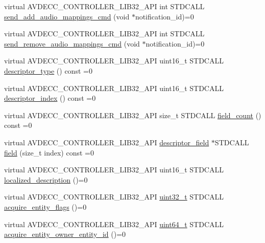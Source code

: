\begin{DoxyCompactItemize}
\item 
virtual A\+V\+D\+E\+C\+C\+\_\+\+C\+O\+N\+T\+R\+O\+L\+L\+E\+R\+\_\+\+L\+I\+B32\+\_\+\+A\+PI int S\+T\+D\+C\+A\+LL \hyperlink{classavdecc__lib_1_1stream__port__output__descriptor_a5d94b5190eaba5a650afd90d6e483d72}{send\+\_\+add\+\_\+audio\+\_\+mappings\+\_\+cmd} (void $\ast$notification\+\_\+id)=0
\item 
virtual A\+V\+D\+E\+C\+C\+\_\+\+C\+O\+N\+T\+R\+O\+L\+L\+E\+R\+\_\+\+L\+I\+B32\+\_\+\+A\+PI int S\+T\+D\+C\+A\+LL \hyperlink{classavdecc__lib_1_1stream__port__output__descriptor_ae22529f0333bc3efc10d16ecb3700cd5}{send\+\_\+remove\+\_\+audio\+\_\+mappings\+\_\+cmd} (void $\ast$notification\+\_\+id)=0
\item 
virtual A\+V\+D\+E\+C\+C\+\_\+\+C\+O\+N\+T\+R\+O\+L\+L\+E\+R\+\_\+\+L\+I\+B32\+\_\+\+A\+PI uint16\+\_\+t S\+T\+D\+C\+A\+LL \hyperlink{classavdecc__lib_1_1descriptor__base_a5112b70022171063ec5d3242bee9910e}{descriptor\+\_\+type} () const =0
\item 
virtual A\+V\+D\+E\+C\+C\+\_\+\+C\+O\+N\+T\+R\+O\+L\+L\+E\+R\+\_\+\+L\+I\+B32\+\_\+\+A\+PI uint16\+\_\+t S\+T\+D\+C\+A\+LL \hyperlink{classavdecc__lib_1_1descriptor__base_a7eed5583bffdf72d89021b188648c1b5}{descriptor\+\_\+index} () const =0
\item 
virtual A\+V\+D\+E\+C\+C\+\_\+\+C\+O\+N\+T\+R\+O\+L\+L\+E\+R\+\_\+\+L\+I\+B32\+\_\+\+A\+PI size\+\_\+t S\+T\+D\+C\+A\+LL \hyperlink{classavdecc__lib_1_1descriptor__base_ab1edf4996377ed957088a7b3b16aca7d}{field\+\_\+count} () const =0
\item 
virtual A\+V\+D\+E\+C\+C\+\_\+\+C\+O\+N\+T\+R\+O\+L\+L\+E\+R\+\_\+\+L\+I\+B32\+\_\+\+A\+PI \hyperlink{classavdecc__lib_1_1descriptor__field}{descriptor\+\_\+field} $\ast$S\+T\+D\+C\+A\+LL \hyperlink{classavdecc__lib_1_1descriptor__base_aa3716832eed0b6f6dcfba358c5d2c601}{field} (size\+\_\+t index) const =0
\item 
virtual A\+V\+D\+E\+C\+C\+\_\+\+C\+O\+N\+T\+R\+O\+L\+L\+E\+R\+\_\+\+L\+I\+B32\+\_\+\+A\+PI uint16\+\_\+t S\+T\+D\+C\+A\+LL \hyperlink{classavdecc__lib_1_1descriptor__base_a1fb9de45567df344090a1407aa6b775f}{localized\+\_\+description} ()=0
\item 
virtual A\+V\+D\+E\+C\+C\+\_\+\+C\+O\+N\+T\+R\+O\+L\+L\+E\+R\+\_\+\+L\+I\+B32\+\_\+\+A\+PI \hyperlink{parse_8c_a6eb1e68cc391dd753bc8ce896dbb8315}{uint32\+\_\+t} S\+T\+D\+C\+A\+LL \hyperlink{classavdecc__lib_1_1descriptor__base_a42f2a796375edd05c8d29856c018042d}{acquire\+\_\+entity\+\_\+flags} ()=0
\item 
virtual A\+V\+D\+E\+C\+C\+\_\+\+C\+O\+N\+T\+R\+O\+L\+L\+E\+R\+\_\+\+L\+I\+B32\+\_\+\+A\+PI \hyperlink{parse_8c_aec6fcb673ff035718c238c8c9d544c47}{uint64\+\_\+t} S\+T\+D\+C\+A\+LL \hyperlink{classavdecc__lib_1_1descriptor__base_a6480d803970d505ce7a9b429a6eb71bd}{acquire\+\_\+entity\+\_\+owner\+\_\+entity\+\_\+id} ()=0

\end{DoxyCompactItemize}
